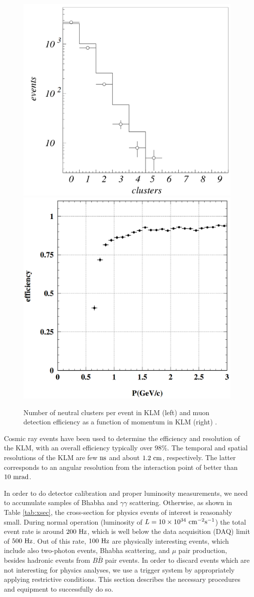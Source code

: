 \begin{figure}[H]
	\centering
	\captionsetup{width=0.8\linewidth}
	\includegraphics[width=0.48\linewidth,trim = 0cm -1.5cm 0cm 0cm]{fig/setup/KLM_clusters}
	\includegraphics[width=0.48\linewidth]{fig/setup/KLM_efficiency}
	\caption{Number of neutral clusters per event in KLM (left) and muon detection efficiency as a function of momentum in KLM (right) \cite{ABASHIAN2002117}.}
	\label{fig:KLM_eff}
\end{figure}

Cosmic ray events have been used to determine the efficiency and resolution of the KLM, with an overall efficiency typically over $98\%$. The temporal and spatial resolutions of the KLM are few$\mathrm{~ns}$ and about $1.2\mathrm{~cm}$, respectively. The latter corresponds to an angular resolution from the interaction point of better than $10\mathrm{~mrad}$.

In order to do detector calibration and proper luminosity measurements, we need to accumulate samples of Bhabha and $\gamma\gamma$ scattering. Otherwise, as shown in Table \ref{tab:xsec}, the cross-section for physics events of interest is reasonably small. During normal operation (luminosity of $L = 10\times 10^{34}\mathrm{~cm^{-2}s^{-1}}$) the total event rate is around $200\mathrm{~Hz}$, which is well below the data acquisition (DAQ) limit of $500\mathrm{~Hz}$. Out of this rate, $100\mathrm{~Hz}$ are physically interesting events, which include also two-photon events, Bhabha scattering, and $\mu$ pair production, besides hadronic events from $B \bar B$ pair events. In order to discard events which are not interesting for physics analyses, we use a trigger system by appropriately applying restrictive conditions. This section describes the necessary procedures and equipment to successfully do so.

